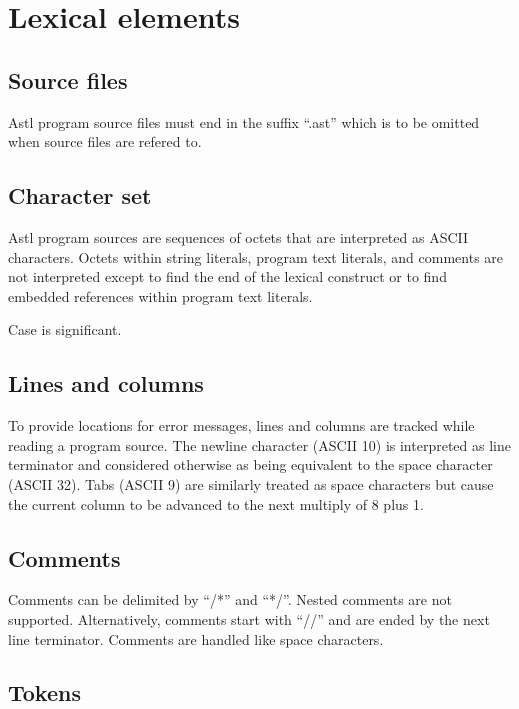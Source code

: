 \chapter{Lexical elements}

\section{Source files}

Astl program source files must end in the
suffix ``.ast'' which is to be omitted when
source files are refered to.

\section{Character set}

Astl program sources are sequences of octets that are interpreted as
ASCII characters. Octets within string literals, program text literals,
and comments are not interpreted except to find the end of the lexical
construct or to find embedded references within program text literals.

Case is significant.

\section{Lines and columns}

To provide locations for error messages,
lines and columns are tracked while reading a
program source. The newline character
(ASCII 10) is interpreted as line terminator
and considered otherwise as being equivalent to the space
character (ASCII 32). Tabs (ASCII 9) are similarly treated as
space characters but cause the current column to be advanced to the next
multiply of 8 plus 1.

\section{Comments}

Comments can be delimited by ``/*'' and ``*/''. Nested comments
are not supported. Alternatively, comments start with ``//'' and
are ended by the next line terminator.
Comments are handled like space characters.

\section{Tokens}

